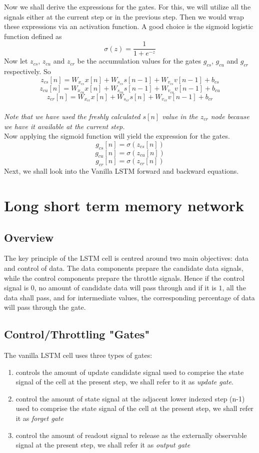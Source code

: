 \documentclass[12pt,letterpaper]{article}
\begin{document}
Now we shall derive the expressions for the gates.
For this, we will utilize all the signals either at the current step or in the previous step.
Then we would wrap these expressions via an activation function. A good choice is the sigmoid logistic function defined as
\[
\sigma(z) = \frac{1}{1+e^{-z}}\tag{26}
\]
Now let $z_{cs}$, $z_{cu}$ and $z_{cr}$ be the accumulation values for the gates $g_{cs}$, $g_{cu}$ and $g_{cr}$ respectively. 
So
\[
z_{cs}[n] = W_{x_{cs}}x[n] + W_{s_{cs}}s[n-1] + W_{v_{cs}}v[n-1]+b_{cs}\tag{27}
\]
\[
z_{cu}[n] = W_{x_{cu}}x[n] + W_{s_{cu}}s[n-1] + W_{v_{cu}}v[n-1]+b_{cu}\tag{28}
\]
\[
z_{cr}[n] = W_{x_{cr}}x[n] + W_{s_{cr}}s[n] + W_{v_{cr}}v[n-1]+b_{cr}\tag{29}
\]
\\
\textit{Note that we have used the freshly calculated $s[n]$ value in the $z_{cr}$ node because we have it available at the current step.}\\
Now applying the sigmoid function will yield the expression for the gates.
\[
g_{cs}[n] = \sigma(z_{cs}[n])\tag{30}
\]
\[
g_{cu}[n] = \sigma(z_{cu}[n])\tag{31}
\]
\[
g_{cr}[n] = \sigma(z_{cr}[n])\tag{32}
\]
Next, we shall look into the Vanilla LSTM forward and backward equations.

\section{Long short term memory network}
\subsection{Overview}
The key principle of the LSTM cell is centred around two main objectives: data and control of data. The data components prepare the candidate data signals, while the control components prepare the throttle signals. Hence if the control signal is $0$, no amount of candidate data will pass through and if it is $1$, all the data shall pass, and for intermediate values, the corresponding percentage of data will pass through the gate.
\subsection{Control/Throttling "Gates"}
The vanilla LSTM cell uses three types of gates:
\begin{enumerate}
    \item controls the amount of update candidate signal used to comprise the state signal of the cell at the present step, we shall refer to it as \textit{update gate}.
    \item control the amount of state signal at the adjacent lower indexed step (n-1)  used to comprise the state signal of the cell at the present step, we shall refer it as \textit{forget gate}
    \item control the amount of readout signal to release as the externally observable signal at the present step, we shall refer it as \textit{output gate}
\end{enumerate}
\end{document}
